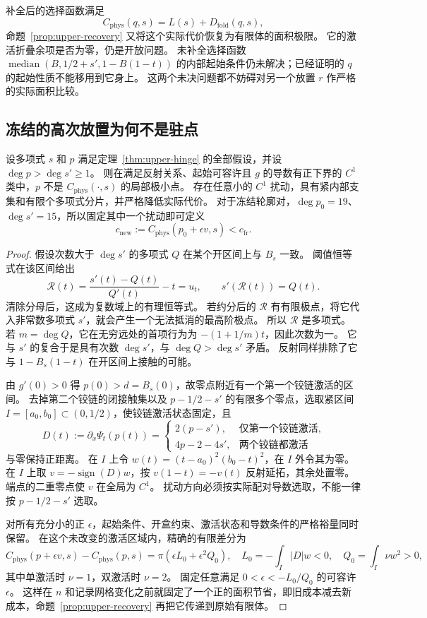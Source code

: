 补全后的选择函数满足
\[
 C_{\mathrm{phys}}(q,s)=L(s)+D_{\mathrm{fold}}(q,s),
\]
命题~\ref{prop:upper-recovery} 又将这个实际代价恢复为有限体的面积极限。
它的激活折叠余项是否为零，仍是开放问题。
未补全选择函数 $\operatorname{median}(B,1/2+s',1-B(1-t))$ 的内部起始条件仍未解决；已经证明的 $q$ 的起始性质不能移用到它身上。
这两个未决问题都不妨碍对另一个放置 $r$ 作严格的实际面积比较。

\subsection{冻结的高次放置为何不是驻点}
\label{subsec:upper-polynomial}

\begin{theorem}[多项式接触刚性与下降]\label{thm:upper-polynomial}
设多项式 $s$ 和 $p$ 满足定理~\ref{thm:upper-hinge} 的全部假设，并设 $\deg p>\deg s'\ge1$。
则在满足反射关系、起始可容许且 $g$ 的导数有正下界的 $C^1$ 类中，$p$ 不是 $C_{\mathrm{phys}}(\cdot,s)$ 的局部极小点。
存在任意小的 $C^1$ 扰动，具有紧内部支集和有限个多项式分片，并严格降低实际代价。
对于冻结轮廓对，$\deg p_0=19$、$\deg s'=15$，所以固定其中一个扰动即可定义
\[
 c_{\mathrm{new}}:=C_{\mathrm{phys}}(p_0+\epsilon v,s)<c_{\mathrm{fr}}.
\]
\end{theorem}

\begin{proof}
假设次数大于 $\deg s'$ 的多项式 $Q$ 在某个开区间上与 $B_s$ 一致。
阈值恒等式在该区间给出
\[
 \mathcal R(t)=\frac{s'(t)-Q(t)}{Q'(t)}-t=u_t,
 \qquad s'(\mathcal R(t))=Q(t).
\]
清除分母后，这成为复数域上的有理恒等式。
若约分后的 $\mathcal R$ 有有限极点，将它代入非常数多项式 $s'$，就会产生一个无法抵消的最高阶极点。
所以 $\mathcal R$ 是多项式。
若 $m=\deg Q$，它在无穷远处的首项行为为 $-(1+1/m)t$，因此次数为一。
它与 $s'$ 的复合于是具有次数 $\deg s'$，与 $\deg Q>\deg s'$ 矛盾。
反射同样排除了它与 $1-B_s(1-t)$ 在开区间上接触的可能。

由 $g'(0)>0$ 得 $p(0)>d=B_s(0)$，故零点附近有一个第一个铰链激活的区间。
去掉第二个铰链的闭接触集以及 $p-1/2-s'$ 的有限多个零点，选取紧区间 $I=[a_0,b_0]\subset(0,1/2)$，使铰链激活状态固定，且
\[
 D(t):=\partial_x\Psi_t(p(t))
 =\begin{cases}2(p-s'),&\text{仅第一个铰链激活},\\
                 4p-2-4s',&\text{两个铰链都激活}
   \end{cases}
\]
与零保持正距离。
在 $I$ 上令 $w(t)=(t-a_0)^2(b_0-t)^2$，在 $I$ 外令其为零。
在 $I$ 上取 $v=-\operatorname{sign}(D)w$，按 $v(1-t)=-v(t)$ 反射延拓，其余处置零。
端点的二重零点使 $v$ 在全局为 $C^1$。
扰动方向必须按实际配对导数选取，不能一律按 $p-1/2-s'$ 选取。

对所有充分小的正 $\epsilon$，起始条件、开盒约束、激活状态和导数条件的严格裕量同时保留。
在这个未改变的激活区域内，精确的有限差分为
\[
 C_{\mathrm{phys}}(p+\epsilon v,s)-C_{\mathrm{phys}}(p,s)
     =\pi(\epsilon L_0+\epsilon^2Q_0),
\quad L_0=-\int_I|D|w<0,\quad Q_0=\int_I\nu w^2>0,
\]
其中单激活时 $\nu=1$，双激活时 $\nu=2$。
固定任意满足 $0<\epsilon<-L_0/Q_0$ 的可容许 $\epsilon$。
这样在 $n$ 和记录网格变化之前就固定了一个正的面积节省，即旧成本减去新成本，命题~\ref{prop:upper-recovery} 再把它传递到原始有限体。
\end{proof}

